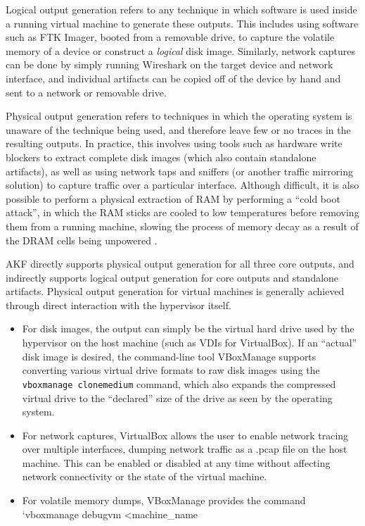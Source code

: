 \documentclass[letterpaper,12pt]{report}
\def\tightlist{}
\newcommand{\passthrough}[1]{#1}
\begin{document}
Logical output generation refers to any technique in which software is
used inside a running virtual machine to generate these outputs. This
includes using software such as FTK Imager, booted from a removable
drive, to capture the volatile memory of a device or construct a
\emph{logical} disk image. Similarly, network captures can be done by
simply running Wireshark on the target device and network interface, and
individual artifacts can be copied off of the device by hand and sent to
a network or removable drive.

Physical output generation refers to techniques in which the operating
system is unaware of the technique being used, and therefore leave few
or no traces in the resulting outputs. In practice, this involves using
tools such as hardware write blockers to extract complete disk images
(which also contain standalone artifacts), as well as using network taps
and sniffers (or another traffic mirroring solution) to capture traffic
over a particular interface. Although difficult, it is also possible to
perform a physical extraction of RAM by performing a ``cold boot
attack'', in which the RAM sticks are cooled to low temperatures before
removing them from a running machine, slowing the process of memory
decay as a result of the DRAM cells being unpowered
\cite{yitbarekColdBootAttacks2017}.

AKF directly supports physical output generation for all three core
outputs, and indirectly supports logical output generation for core
outputs and standalone artifacts. Physical output generation for virtual
machines is generally achieved through direct interaction with the
hypervisor itself.

\begin{itemize}
\tightlist
\item
  For disk images, the output can simply be the virtual hard drive used
  by the hypervisor on the host machine (such as VDIs for VirtualBox).
  If an ``actual'' disk image is desired, the command-line tool
  VBoxManage supports converting various virtual drive formats to raw
  disk images using the \passthrough{\lstinline!vboxmanage clonemedium!}
  command, which also expands the compressed virtual drive to the
  ``declared'' size of the drive as seen by the operating system.\\
\item
  For network captures, VirtualBox allows the user to enable network
  tracing over multiple interfaces, dumping network traffic as a .pcap
  file on the host machine. This can be enabled or disabled at any time
  without affecting network connectivity or the state of the virtual
  machine.\\
\item
  For volatile memory dumps, VBoxManage provides the command `vboxmanage
  debugvm \textless machine\_name
\end{itemize}
\end{document}
